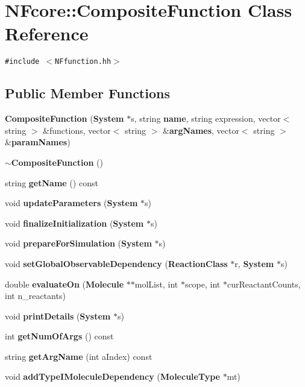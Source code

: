 \section{NFcore::CompositeFunction Class Reference}
\label{classNFcore_1_1CompositeFunction}
{\tt \#include $<$NFfunction.hh$>$}

\subsection*{Public Member Functions}
\begin{CompactItemize}
\item 
{\bf CompositeFunction} ({\bf System} $\ast$s, string {\bf name}, string expression, vector$<$ string $>$ \&functions, vector$<$ string $>$ \&{\bf argNames}, vector$<$ string $>$ \&{\bf paramNames})
\item 
{\bf $\sim$CompositeFunction} ()
\item 
string {\bf getName} () const 
\item 
void {\bf updateParameters} ({\bf System} $\ast$s)
\item 
void {\bf finalizeInitialization} ({\bf System} $\ast$s)
\item 
void {\bf prepareForSimulation} ({\bf System} $\ast$s)
\item 
void {\bf setGlobalObservableDependency} ({\bf ReactionClass} $\ast$r, {\bf System} $\ast$s)
\item 
double {\bf evaluateOn} ({\bf Molecule} $\ast$$\ast$molList, int $\ast$scope, int $\ast$curReactantCounts, int n\_\-reactants)
\item 
void {\bf printDetails} ({\bf System} $\ast$s)
\item 
int {\bf getNumOfArgs} () const 
\item 
string {\bf getArgName} (int aIndex) const 
\item 
void {\bf addTypeIMoleculeDependency} ({\bf MoleculeType} $\ast$mt)
\end{CompactItemize}
